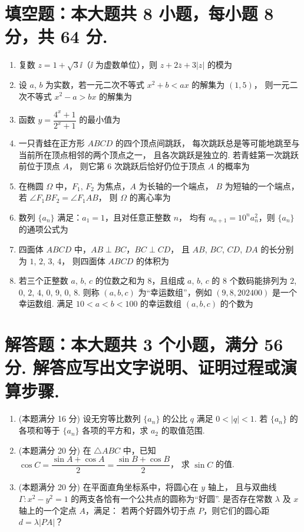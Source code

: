 \documentclass{chsmc}
\begin{document}
\section{填空题：本大题共 8 小题，每小题 8 分，共 64 分.}

\begin{enumerate}
	\item 复数 $z = 1 + \sqrt{3}\ii$（$\ii$ 为虚数单位），则
		$z + 2\overline{z} + 3|z|$ 的模为 \blankline
	\item 设 $a$, $b$ 为实数，若一元二次不等式 $x^2 + b < ax$ 的解集为 $(1,5)$，
		则一元二次不等式 $x^2 - a > bx$ 的解集为 \blankline
	\item 函数 $y = \dfrac{4^x + 1}{2^x + 1}$ 的最小值为 \blankline
	\item 一只青蛙在正方形 $ABCD$ 的四个顶点间跳跃，
		每次跳跃总是等可能地跳至与当前所在顶点相邻的两个顶点之一，
		且各次跳跃是独立的. 若青蛙第一次跳跃前位于顶点 $A$，
		则它第 $6$ 次跳跃后恰好仍位于顶点 $A$ 的概率为 \blankline
	\item 在椭圆 $\Omega$ 中，$F_1$, $F_2$ 为焦点，$A$ 为长轴的一个端点，
		$B$ 为短轴的一个端点，若 $\angle F_1BF_2 = \angle F_1AB$，
		则 $\Omega$ 的离心率为 \blankline
	\item 数列 $\{a_n\}$ 满足：$a_1 = 1$，且对任意正整数 $n$，
		均有 $a_{n+1} = 10^n a_n^2$，则 $\{a_n\}$ 的通项公式为 \blankline
	\item 四面体 $ABCD$ 中，$AB \perp BC$，$BC \perp CD$，
		且 $AB$, $BC$, $CD$, $DA$ 的长分别为 $1$, $2$, $3$, $4$，
		则四面体 $ABCD$ 的体积为 \blankline
	\item 若三个正整数 $a$, $b$, $c$ 的位数之和为 $8$，且组成 $a$, $b$, $c$
		的 $8$ 个数码能排列为 $2$, $0$, $2$, $4$, $0$, $9$, $0$, $8$.
		则称 $(a,b,c)$ 为“幸运数组”，例如 $(9,8,202400)$ 是一个幸运数组.
		满足 $10 < a < b < 100$ 的幸运数组 $(a,b,c)$ 的个数为 \blankline
\end{enumerate}

\section{解答题：本大题共 3 个小题，满分 56 分. 解答应写出文字说明、证明过程或演算步骤.}

\begin{enumerate}[resume]
	\item (本题满分 16 分) 设无穷等比数列 $\{a_n\}$ 的公比 $q$ 满足 $0 < |q| < 1$.
		若 $\{a_n\}$ 的各项和等于 $\{a_n\}$ 各项的平方和，求 $a_2$ 的取值范围.
	\item (本题满分 20 分) 在 $\triangle ABC$ 中，已知
		$\cos C = \dfrac{\sin A + \cos A}{2} = \dfrac{\sin B + \cos B}{2}$，
		求 $\sin C$ 的值.
	\item (本题满分 20 分) 在平面直角坐标系中，将圆心在 $y$ 轴上，
		且与双曲线 $\Gamma\colon x^2-y^2=1$ 的两支各恰有一个公共点的圆称为“好圆”.
		是否存在常数 $\lambda$ 及 $x$ 轴上的一个定点 $A$，满足：
		若两个好圆外切于点 $P$，则它们的圆心距 $d = \lambda|PA|$？
\end{enumerate}
\end{document}
